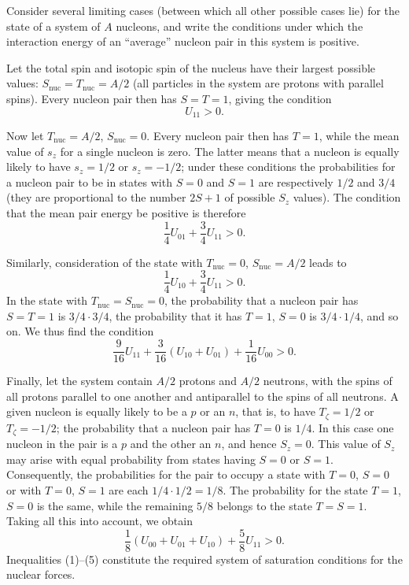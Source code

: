 \SolutionHeading Consider several limiting cases (between which all other
possible cases lie) for the state of a system of $A$ nucleons, and write the
conditions under which the interaction energy of an ``average'' nucleon pair
in this system is positive.

Let the total spin and isotopic spin of the nucleus have their largest possible
values: $S_{\text{nuc}}=T_{\text{nuc}}=A/2$ (all particles in the system are
protons with parallel spins). Every nucleon pair then has $S=T=1$, giving the
condition
\begin{equation}
 U_{11}>0.
 \tag{1}
\end{equation}

Now let $T_{\text{nuc}}=A/2$, $S_{\text{nuc}}=0$. Every nucleon pair then has
$T=1$, while the mean value of $s_z$ for a single nucleon is zero. The latter
means that a nucleon is equally likely to have $s_z=1/2$ or $s_z=-1/2$; under
these conditions the probabilities for a nucleon pair to be in states with
$S=0$ and $S=1$ are respectively $1/2$ and $3/4$ (they are proportional to
the number $2S+1$ of possible $S_z$ values). The condition that the mean pair
energy be positive is therefore
\begin{equation}
 \frac14U_{01}+\frac34U_{11}>0.
 \tag{2}
\end{equation}

Similarly, consideration of the state with $T_{\text{nuc}}=0$,
$S_{\text{nuc}}=A/2$ leads to
\begin{equation}
 \frac14U_{10}+\frac34U_{11}>0.
 \tag{3}
\end{equation}
In the state with $T_{\text{nuc}}=S_{\text{nuc}}=0$, the probability that a
nucleon pair has $S=T=1$ is $3/4\cdot3/4$, the probability that it has $T=1$,
$S=0$ is $3/4\cdot1/4$, and so on. We thus find the condition
\begin{equation}
 \frac9{16}U_{11}+\frac3{16}(U_{10}+U_{01})+\frac1{16}U_{00}>0.
 \tag{4}
\end{equation}

Finally, let the system contain $A/2$ protons and $A/2$ neutrons, with the
spins of all protons parallel to one another and antiparallel to the spins of
all neutrons. A given nucleon is equally likely to be a $p$ or an $n$, that is,
to have $T_\zeta=1/2$ or $T_\zeta=-1/2$; the probability that a nucleon pair
has $T=0$ is $1/4$. In this case one nucleon in the pair is a $p$ and the
other an $n$, and hence $S_z=0$. This value of $S_z$ may arise with equal
probability from states having $S=0$ or $S=1$. Consequently, the probabilities
for the pair to occupy a state with $T=0$, $S=0$ or with $T=0$, $S=1$ are
each $1/4\cdot1/2=1/8$. The probability for the state $T=1$, $S=0$ is the
same, while the remaining $5/8$ belongs to the state $T=S=1$. Taking all this
into account, we obtain
\begin{equation}
 \frac18(U_{00}+U_{01}+U_{10})+\frac58U_{11}>0.
 \tag{5}
\end{equation}
Inequalities (1)--(5) constitute the required system of saturation conditions
for the nuclear forces.
